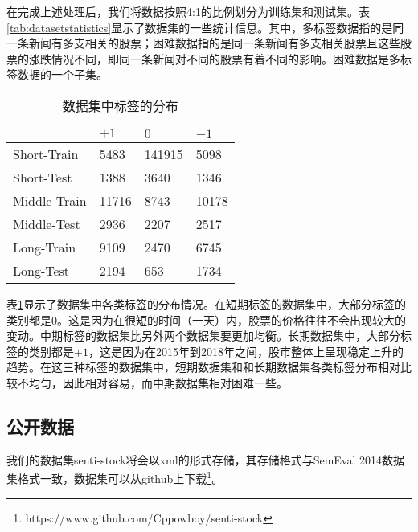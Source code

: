 在完成上述处理后，我们将数据按照4:1的比例划分为训练集和测试集。表\ref{tab:datasetstatistics}显示了数据集的一些统计信息。其中，多标签数据指的是同一条新闻有多支相关的股票；困难数据指的是同一条新闻有多支相关股票且这些股票的涨跌情况不同，即同一条新闻对不同的股票有着不同的影响。困难数据是多标签数据的一个子集。

\begin{table}[ht]
	\centering
	\begin{minipage}[t]{0.8\linewidth}
		\caption{数据集中标签的分布}
		\label{tab:labeldistribution}
		\begin{tabularx}{\linewidth}{lXXX}
			\toprule 
			& $+1$ & $0$ & $-1$ \\ \midrule  
			Short-Train & 5483 & 141915 & 5098 \\ 
			Short-Test & 1388 & 3640 &1346 \\
			Middle-Train & 11716 & 8743 & 10178 \\
			Middle-Test & 2936 & 2207 & 2517 \\ 
			Long-Train & 9109 & 2470 & 6745 \\ 
			Long-Test & 2194 & 653 & 1734\\ 
			\bottomrule
		\end{tabularx}
	\end{minipage}
\end{table}

表\ref{tab:labeldistribution}显示了数据集中各类标签的分布情况。在短期标签的数据集中，大部分标签的类别都是$0$。这是因为在很短的时间（一天）内，股票的价格往往不会出现较大的变动。中期标签的数据集比另外两个数据集要更加均衡。长期数据集中，大部分标签的类别都是$+1$，这是因为在2015年到2018年之间，股市整体上呈现稳定上升的趋势。在这三种标签的数据集中，短期数据集和和长期数据集各类标签分布相对比较不均匀，因此相对容易，而中期数据集相对困难一些。

\subsection{公开数据}

我们的数据集senti-stock将会以xml的形式存储，其存储格式与SemEval 2014数据集格式一致\cite{pontiki2014semeval-2014}，数据集可以从github上下载\footnote{https://www.github.com/Cppowboy/senti-stock}。
